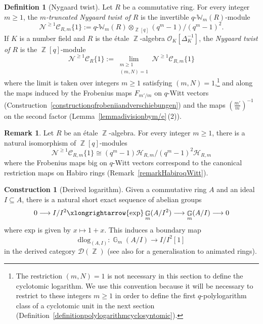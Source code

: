 \documentclass[10pt,twoside]{scrarticle}
\newlength{\mar} \setlength{\mar}{1cm}%
\newlength{\len}
\theoremstyle{definition}
\newtheorem{remark}[theorem]{Remark}
\newtheorem{construction}[theorem]{Construction}
\newtheorem{definition}[theorem]{Definition}
\DeclareMathOperator{\Z}{\mathbb{Z}}
\DeclareMathOperator{\G}{\mathbb{G}}
\newcommand{\nbrrg}{\mathcal{O}_K[\Delta_K^{-1}]}
\newcommand{\CR}{\mathcal{C}_{R}}
\newcommand{\CRm}{\mathcal{C}_{R,m}}
\newcommand{\qWm}{q\text{-}\mathbb{W}_m}
\renewcommand{\ge}{\geqslant}
\newcommand{\dlog}{\mathrm{dlog}}
\numberwithin{equation}{theorem}
\begin{document}
\begin{definition}[Nygaard twist]\label{definitionNygaardtwistedcyclotomicring}
    Let $R$ be a commutative ring. For every integer $m \ge 1$, the \emph{$m$-truncated Nygaard twist of $R$} is the invertible $\qWm(R)$-module
    $$\mathcal{N}^{\ge 1} \CRm\{1\} := \qWm(R) \otimes_{\Z[q]} (q^m-1)/(q^m-1)^2.$$
    If $K$ is a number field and $R$ is the étale $\Z$-algebra $\nbrrg$, the \emph{Nygaard twist of $R$} is the $\Z[q]$\nobreakdash-module
    $$\mathcal{N}^{\ge 1} \CR\{1\} := \lim_{\substack{m \ge 1 \\ (m,N)=1}} \mathcal{N}^{\ge 1} \CRm\{1\}$$
    where the limit is taken over integers $m \ge 1$ satisfying $(m,N)=1$,\footnote{The restriction $(m,N)=1$ is not necessary in this section to define the cyclotomic logarithm. We use this convention because it will be necessary to restrict to these integers $m \ge 1$ in order to define the first $q$-polylogarithm class of a cyclotomic unit in the next section (Definition~\ref{definitionpolylogarithmcyclosyntomic}).} and along the maps induced by the Frobenius maps $F_{m'/m}$ on $q$-Witt vectors (Construction~\ref{constructionqfrobeniiandverschiebungen}) and the maps $(\frac{m'}{m})^{-1}$ on the second factor (Lemma~\ref{lemmadivisionbym/e}\,(2)).
\end{definition}

\begin{remark}\label{remarkNygaardwithHabiro}
    Let $R$ be an étale $\Z$-algebra. For every integer $m \ge 1$, there is a natural isomorphism of $\Z[q]$-modules
    $$\mathcal{N}^{\ge 1} \CRm\{1\} \cong (q^m-1)\mathcal{H}_{R,m}/(q^m-1)^2\mathcal{H}_{R,m}$$
    where the Frobenius maps big on $q$-Witt vectors correspond to the canonical restriction maps on Habiro rings (Remark~\ref{remarkHabiroqWitt}).
\end{remark}

\begin{construction}[Derived logarithm]\label{constructiondlog}
    Given a commutative ring $A$ and an ideal $I \subseteq A$, there is a natural short exact sequence of abelian groups
    $$0 \longrightarrow I/I^2 \xlongrightarrow{\text{exp}} \G_m(A/I^2) \longrightarrow \G_m(A/I) \longrightarrow 0$$
    where $\text{exp}$ is given by $x \mapsto 1+x$. This induces a boundary map $$\dlog_{(A,I)} : \G_m(A/I) \longrightarrow I/I^2[1]$$ in the derived category $\mathcal{D}(\Z)$ (see also \cite[Construction 2.7]{mao_prismatic_2024} for a generalisation to animated rings).
\end{construction}
\end{document}
